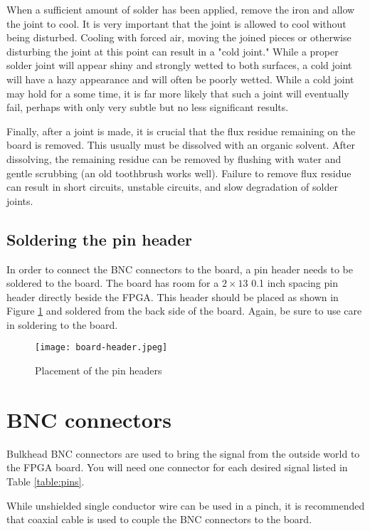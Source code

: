 When a sufficient amount of solder has been applied, remove the iron
and allow the joint to cool. It is very important that the joint is
allowed to cool without being disturbed. Cooling with forced air,
moving the joined pieces or otherwise disturbing the joint at this
point can result in a "cold joint." While a proper solder joint will
appear shiny and strongly wetted to both surfaces, a cold joint will
have a hazy appearance and will often be poorly wetted. While a cold
joint may hold for a some time, it is far more likely that such a
joint will eventually fail, perhaps with only very subtle but no less
significant results.

Finally, after a joint is made, it is crucial that the flux residue
remaining on the board is removed. This usually must be dissolved with
an organic solvent. After dissolving, the remaining residue can be
removed by flushing with water and gentle scrubbing (an old toothbrush
works well). Failure to remove flux residue can result in short
circuits, unstable circuits, and slow degradation of solder joints.

\subsection{Soldering the pin header}

In order to connect the BNC connectors to the board, a pin header
needs to be soldered to the board. The board has room for a $2 \times
13$ 0.1 inch spacing pin header directly beside the FPGA. This header
should be placed as shown in Figure \ref{fig:header} and soldered from
the back side of the board. Again, be sure to use care in soldering to
the board.

\begin{figure}
  \center
  \texttt{[image: board-header.jpeg]}
  \caption{Placement of the pin headers}
  \label{fig:header}
\end{figure}

\section{BNC connectors}

Bulkhead BNC connectors are used to bring the signal from the outside
world to the FPGA board. You will need one connector for each desired
signal listed in Table \ref{table:pins}.

While unshielded single conductor wire can be used in a pinch, it is
recommended that coaxial cable is used to couple the BNC connectors to
the board.

